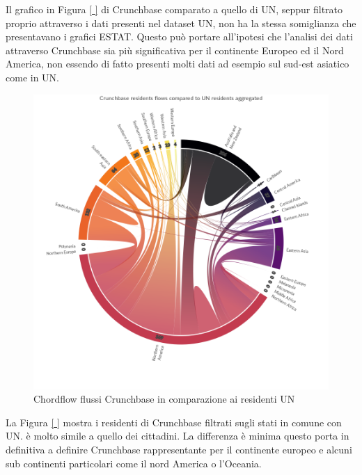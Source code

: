 Il grafico in Figura \ref{ } di Crunchbase comparato a quello di UN, seppur filtrato proprio attraverso i dati presenti nel dataset UN, non ha la stessa somiglianza che presentavano i grafici ESTAT. Questo può portare all'ipotesi che l'analisi dei dati attraverso Crunchbase sia più significativa per il continente Europeo ed il Nord America, non essendo di fatto presenti molti dati ad esempio sul sud-est asiatico come in UN.


\begin{figure}[t]
    \centering
    \includegraphics[width=1.0\textwidth]{images/ChordFlows/Crunchbase_res_UN_True.png}
    \caption{Chordflow flussi Crunchbase in comparazione ai residenti UN}
    \label{fig:chordcrunchunrestrue}
\end{figure}
La Figura \ref{ } mostra i residenti di Crunchbase filtrati sugli stati in comune con UN.  è molto simile a quello dei cittadini. La differenza è minima questo porta in definitiva a definire Crunchbase rappresentante per il continente europeo e alcuni sub continenti particolari come il nord America o l'Oceania. 
